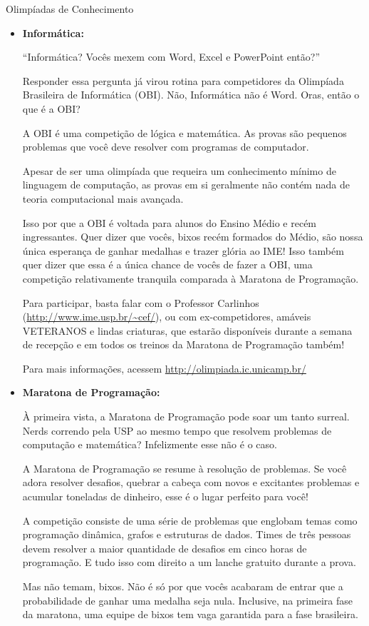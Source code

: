 \begin{subsecao}{Olimpíadas de Conhecimento}
\begin{itemize}
\item{\bf Informática: }

``Informática? Vocês mexem com Word, Excel e PowerPoint então?''

Responder essa pergunta já virou rotina para competidores da
Olimpíada Brasileira de Informática (OBI). Não, Informática 
não é Word. Oras, então o que é a OBI?

A OBI é uma competição de lógica e matemática. As provas são pequenos
problemas que você deve resolver com programas de computador.

Apesar de ser uma olimpíada que requeira um conhecimento mínimo de 
linguagem de computação, as provas em si geralmente não contém nada 
de teoria computacional mais avançada. 

Isso por que a OBI é voltada para alunos do Ensino Médio e recém
ingressantes. Quer dizer que vocês, bixos recém formados do Médio,
são nossa única esperança de ganhar medalhas e trazer glória ao IME!
Isso também quer dizer que essa é a única chance de vocês de fazer a OBI,
uma competição relativamente tranquila comparada à Maratona de 
Programação.

Para participar, basta falar com o Professor Carlinhos (\url{http://www.ime.usp.br/~cef/}), 
ou com ex-competidores, amáveis VETERANOS e lindas criaturas, que estarão disponíveis
durante a semana de recepção e em todos os treinos da Maratona de Programação também!

Para mais informações, acessem \url{http://olimpiada.ic.unicamp.br/}


\item{\bf Maratona de Programação: }

À primeira vista, a Maratona de Programação pode soar um tanto
surreal. Nerds correndo pela USP ao mesmo tempo que resolvem
problemas de computação e matemática? Infelizmente esse não
é o caso.

A Maratona de Programação se resume à resolução de problemas.
Se você adora resolver desafios, quebrar a cabeça com novos
e excitantes problemas e acumular toneladas de dinheiro, esse
é o lugar perfeito para você!

A competição consiste de uma série de problemas que englobam
temas como programação dinâmica, grafos e estruturas de dados.
Times de três pessoas devem resolver a maior quantidade de
desafios em cinco horas de programação. E tudo isso com direito
a um lanche gratuito durante a prova.

Mas não temam, bixos. Não é só por que vocês acabaram de entrar que
a probabilidade de ganhar uma medalha seja nula. Inclusive, na primeira
fase da maratona, uma equipe de bixos tem vaga garantida para a
fase brasileira.


\end{itemize}
\end{subsecao}
